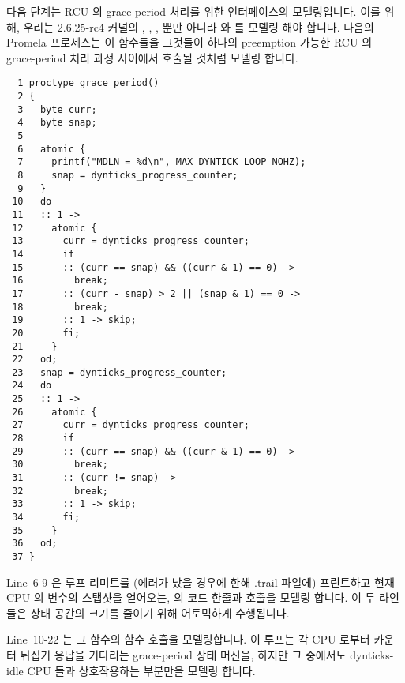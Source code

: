 다음 단계는 RCU 의 grace-period 처리를 위한 인터페이스의 모델링입니다.
이를 위해, 우리는 2.6.25-rc4 커널의
,
,
,
뿐만 아니라
 와
 를 모델링 해야 합니다.
다음의  Promela 프로세스는 이 함수들을 그것들이 하나의
preemption 가능한 RCU 의 grace-period 처리 과정 사이에서 호출될 것처럼 모델링
합니다.
\iffalse

The next step is to model the interface to RCU's grace-period
processing.
For this, we need to model
\co{dyntick_save_progress_counter()},
\co{rcu_try_flip_waitack_needed()},
\co{rcu_try_flip_waitmb_needed()},
as well as portions of
\co{rcu_try_flip_waitack()} and
\co{rcu_try_flip_waitmb()}, all from the 2.6.25-rc4 kernel.
The following \co{grace_period()} Promela process models
these functions as they would be invoked during a single pass
through preemptible RCU's grace-period processing.
\fi

{ \scriptsize
\begin{verbatim}
  1 proctype grace_period()
  2 {
  3   byte curr;
  4   byte snap;
  5
  6   atomic {
  7     printf("MDLN = %d\n", MAX_DYNTICK_LOOP_NOHZ);
  8     snap = dynticks_progress_counter;
  9   }
 10   do
 11   :: 1 ->
 12     atomic {
 13       curr = dynticks_progress_counter;
 14       if
 15       :: (curr == snap) && ((curr & 1) == 0) ->
 16         break;
 17       :: (curr - snap) > 2 || (snap & 1) == 0 ->
 18         break;
 19       :: 1 -> skip;
 20       fi;
 21     }
 22   od;
 23   snap = dynticks_progress_counter;
 24   do
 25   :: 1 ->
 26     atomic {
 27       curr = dynticks_progress_counter;
 28       if
 29       :: (curr == snap) && ((curr & 1) == 0) ->
 30         break;
 31       :: (curr != snap) ->
 32         break;
 33       :: 1 -> skip;
 34       fi;
 35     }
 36   od;
 37 }
\end{verbatim}
}

Line~6-9 은 루프 리미트를 (에러가 났을 경우에 한해 .trail 파일에) 프린트하고
현재 CPU 의  변수의 스탭샷을 얻어오는,
 의 코드 한줄과 
호출을 모델링 합니다.
이 두 라인들은 상태 공간의 크기를 줄이기 위해 어토믹하게 수행됩니다.

Line~10-22 는  그 함수의
 함수 호출을 모델링합니다.
이 루프는 각 CPU 로부터 카운터 뒤집기 응답을 기다리는 grace-period 상태 머신을,
하지만 그 중에서도 dynticks-idle CPU 들과 상호작용하는 부분만을 모델링 합니다.
\iffalse

